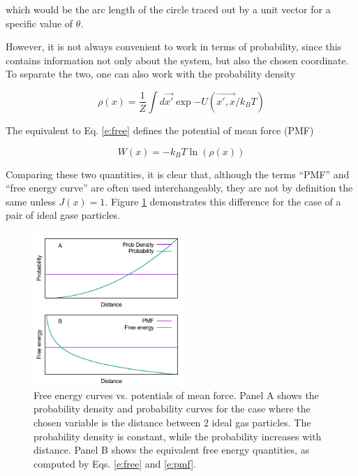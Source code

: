 which would be the arc length of the circle traced out by a unit vector for a
specific value of $\theta$.

However, it is not always convenient to work in terms of probability, since this
contains information not only about the system, but also the chosen coordinate.
To separate the two, one can also work with the probability density

\begin{equation}
    \label{e:dens}
    \rho(x) = \frac{1}{Z} \int d\vec{x'} \exp{-U(\vec{x', x}/k_B T)}
\end{equation}

\noindent
The equivalent to Eq. \ref{e:free} defines the potential of mean force (PMF)

\begin{equation}
    \label{e:pmf}
    W(x) = - k_B T \ln(\rho(x))
\end{equation}

Comparing these two quantities, it is clear that, although the terms ``PMF'' and
``free energy curve'' are often used interchangeably, they are not by definition
the same unless $J(x)=1$.  Figure \ref{f:free} demonstrates this difference for the case of a pair of ideal gase particles.

\begin{figure}
\centering
    \includegraphics[width=5.8cm]{figures/ideal_gas/free}
    \caption{\label{f:free}
    Free energy curves vs. potentials of mean force.  Panel A shows the probability density and probability curves for the case where the chosen variable is the distance between 2 ideal gas particles.  The probability density is constant, while the probability increases with distance.  Panel B shows the equivalent free energy quantities, as computed by Eqs. \ref{e:free} and \ref{e:pmf}.
    }
\end{figure}

